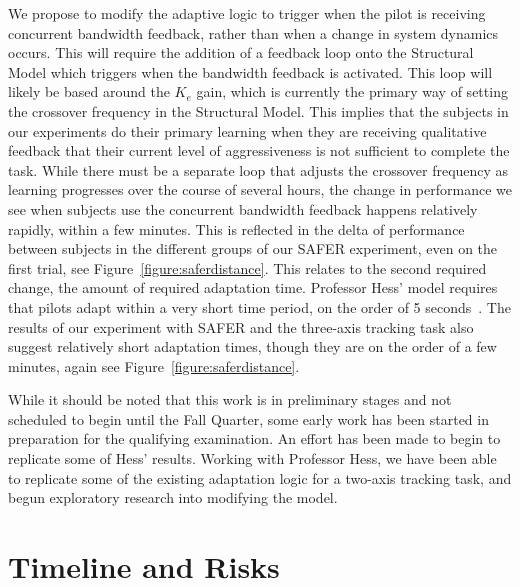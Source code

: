 We propose to modify the adaptive logic to trigger when the pilot is receiving concurrent bandwidth feedback, rather than when a change in system dynamics occurs.
This will require the addition of a feedback loop onto the Structural Model which triggers when the bandwidth feedback is activated.
This loop will likely be based around the $K_e$ gain, which is currently the primary way of setting the crossover frequency in the Structural Model.
This implies that the subjects in our experiments do their primary learning when they are receiving qualitative feedback that their current level of aggressiveness is not sufficient to complete the task.
While there must be a separate loop that adjusts the crossover frequency as learning progresses over the course of several hours, the change in performance we see when subjects use the concurrent bandwidth feedback happens relatively rapidly, within a few minutes.
This is reflected in the delta of performance between subjects in the different groups of our SAFER experiment, even on the first trial, see Figure~\ref{figure:saferdistance}.
This relates to the second required change, the amount of required adaptation time.
Professor Hess' model requires that pilots adapt within a very short time period, on the order of 5 seconds~\citep{weir_model_1966}.
The results of our experiment with SAFER and the three-axis tracking task also suggest relatively short adaptation times, though they are on the order of a few minutes, again see Figure~\ref{figure:saferdistance}.

While it should be noted that this work is in preliminary stages and not scheduled to begin until the Fall Quarter, some early work has been started in preparation for the qualifying examination.
An effort has been made to begin to replicate some of Hess' results.
Working with Professor Hess, we have been able to replicate some of the existing adaptation logic for a two-axis tracking task, and begun exploratory research into modifying the model.


% 

\section{Timeline and Risks}

